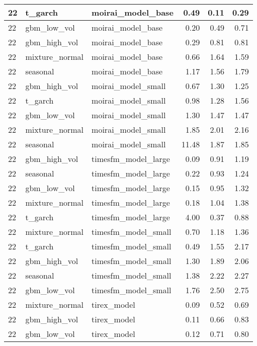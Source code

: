 {\begin{tabular}{lllrrr}
\midrule
22 & t\_garch & moirai\_model\_base & 0.49 & 0.11 & 0.29 \\
\midrule
22 & gbm\_low\_vol & moirai\_model\_base & 0.20 & 0.49 & 0.71 \\
\midrule
22 & gbm\_high\_vol & moirai\_model\_base & 0.29 & 0.81 & 0.81 \\
\midrule
22 & mixture\_normal & moirai\_model\_base & 0.66 & 1.64 & 1.59 \\
\midrule
22 & seasonal & moirai\_model\_base & 1.17 & 1.56 & 1.79 \\
\midrule
22 & gbm\_high\_vol & moirai\_model\_small & 0.67 & 1.30 & 1.25 \\
\midrule
22 & t\_garch & moirai\_model\_small & 0.98 & 1.28 & 1.56 \\
\midrule
22 & gbm\_low\_vol & moirai\_model\_small & 1.30 & 1.47 & 1.47 \\
\midrule
22 & mixture\_normal & moirai\_model\_small & 1.85 & 2.01 & 2.16 \\
\midrule
22 & seasonal & moirai\_model\_small & 11.48 & 1.87 & 1.85 \\
\midrule
22 & gbm\_high\_vol & timesfm\_model\_large & 0.09 & 0.91 & 1.19 \\
\midrule
22 & seasonal & timesfm\_model\_large & 0.22 & 0.93 & 1.24 \\
\midrule
22 & gbm\_low\_vol & timesfm\_model\_large & 0.15 & 0.95 & 1.32 \\
\midrule
22 & mixture\_normal & timesfm\_model\_large & 0.18 & 1.04 & 1.38 \\
\midrule
22 & t\_garch & timesfm\_model\_large & 4.00 & 0.37 & 0.88 \\
\midrule
22 & mixture\_normal & timesfm\_model\_small & 0.70 & 1.18 & 1.36 \\
\midrule
22 & t\_garch & timesfm\_model\_small & 0.49 & 1.55 & 2.17 \\
\midrule
22 & gbm\_high\_vol & timesfm\_model\_small & 1.30 & 1.89 & 2.06 \\
\midrule
22 & seasonal & timesfm\_model\_small & 1.38 & 2.22 & 2.27 \\
\midrule
22 & gbm\_low\_vol & timesfm\_model\_small & 1.76 & 2.50 & 2.75 \\
\midrule
22 & mixture\_normal & tirex\_model & 0.09 & 0.52 & 0.69 \\
\midrule
22 & gbm\_high\_vol & tirex\_model & 0.11 & 0.66 & 0.83 \\
\midrule
22 & gbm\_low\_vol & tirex\_model & 0.12 & 0.71 & 0.80 \\

\end{tabular}}
